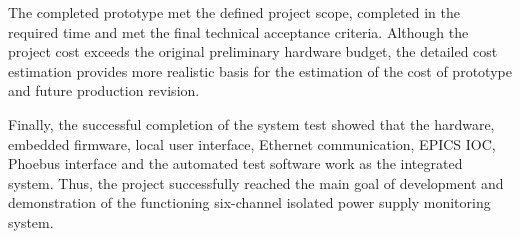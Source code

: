 The completed prototype met the defined project scope, completed in the required time and met the final technical acceptance criteria. Although the project cost exceeds the original preliminary hardware budget, the detailed cost estimation provides more realistic basis for the estimation of the cost of prototype and future production revision.

Finally, the successful completion of the system test showed that the hardware, embedded firmware, local user interface, Ethernet communication, EPICS IOC, Phoebus interface and the automated test software work as the integrated system. Thus, the project successfully reached the main goal of development and demonstration of the functioning six-channel isolated power supply monitoring system.